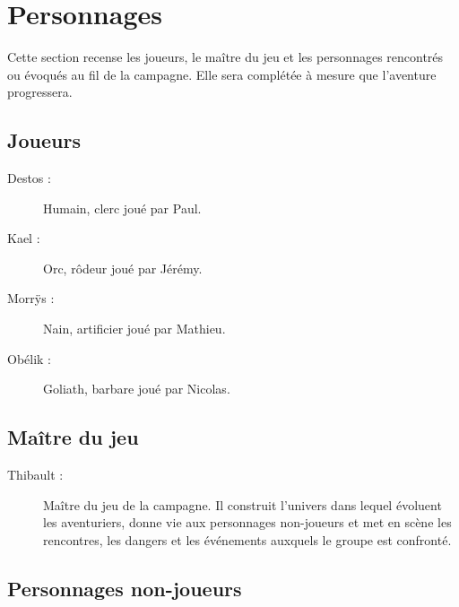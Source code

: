 \chapter*{Personnages}

Cette section recense les joueurs, le maître du jeu et les personnages
rencontrés ou évoqués au fil de la campagne. Elle sera complétée à mesure que
l'aventure progressera.

\section*{Joueurs}

\begin{description}
    \item[Destos :] Humain, clerc joué par Paul.
    \item[Kael :] Orc, rôdeur joué par Jérémy.
    \item[Morrÿs :] Nain, artificier joué par Mathieu.
    \item[Obélik :] Goliath, barbare joué par Nicolas.
\end{description}

\section*{Maître du jeu}

\begin{description}
    \item[Thibault :] Maître du jeu de la campagne. Il construit l'univers
    dans lequel évoluent les aventuriers, donne vie aux personnages
    non-joueurs et met en scène les rencontres, les dangers et les événements
    auxquels le groupe est confronté.
\end{description}

\section*{Personnages non-joueurs}

